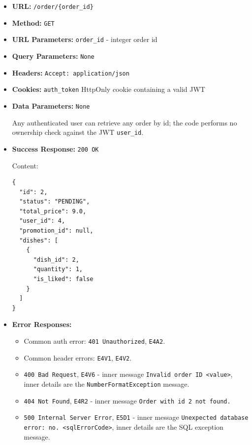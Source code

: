 \begin{itemize}[nosep]
\item \textbf{URL:} \texttt{/order/\{order\_id\}}

\item \textbf{Method:} \texttt{GET}

\item \textbf{URL Parameters:} \texttt{order\_id} - integer order id

\item \textbf{Query Parameters:} \texttt{None}

\item \textbf{Headers:} \texttt{Accept: application/json}

\item \textbf{Cookies:} \texttt{auth\_token} HttpOnly cookie containing a valid JWT

\item \textbf{Data Parameters:} \texttt{None}

Any authenticated user can retrieve any order by id; the code performs no ownership check against the JWT \texttt{user\_id}.

\item \textbf{Success Response:} \texttt{200 OK}

Content:

\begin{lstlisting}
{
  "id": 2,
  "status": "PENDING",
  "total_price": 9.0,
  "user_id": 4,
  "promotion_id": null,
  "dishes": [
    {
      "dish_id": 2,
      "quantity": 1,
      "is_liked": false
    }
  ]
}
\end{lstlisting}

\item \textbf{Error Responses:}

\begin{itemize}[nosep]
\item Common auth error: \texttt{401 Unauthorized}, \texttt{E4A2}.
\item Common header errors: \texttt{E4V1}, \texttt{E4V2}.
\item \texttt{400 Bad Request}, \texttt{E4V6} - inner message \texttt{Invalid order ID <value>}, inner details are the \texttt{NumberFormatException} message.
\item \texttt{404 Not Found}, \texttt{E4R2} - inner message \texttt{Order with id 2 not found.}
\item \texttt{500 Internal Server Error}, \texttt{E5D1} - inner message \texttt{Unexpected database error: no. <sqlErrorCode>}, inner details are the SQL exception message.
\end{itemize}

\end{itemize}

